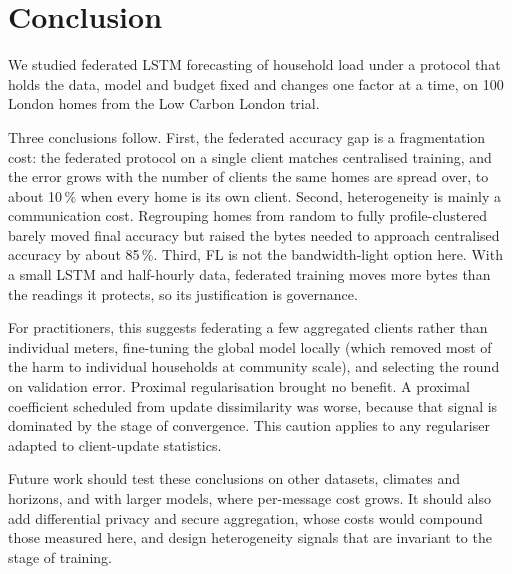 \section{Conclusion}\label{sec:conclusion}

We studied federated LSTM forecasting of household load under a protocol that holds the data, model and budget fixed
and changes one factor at a time, on 100 London homes from the Low Carbon London trial.

Three conclusions follow. First, the federated accuracy gap is a fragmentation cost: the federated protocol on a
single client matches centralised training, and the error grows with the number of clients the same homes are spread
over, to about 10\,\% when every home is its own client. Second, heterogeneity is mainly a communication cost.
Regrouping homes from random to fully profile-clustered barely moved final accuracy but raised the bytes needed to
approach centralised accuracy by about 85\,\%. Third, FL is not the bandwidth-light option here. With a small LSTM and
half-hourly data, federated training moves more bytes than the readings it protects, so its justification is
governance.

For practitioners, this suggests federating a few aggregated clients rather than individual meters, fine-tuning the
global model locally (which removed most of the harm to individual households at community scale), and selecting the
round on validation error. Proximal regularisation brought no benefit. A proximal coefficient scheduled from update
dissimilarity was worse, because that signal is dominated by the stage of convergence. This caution applies to any
regulariser adapted to client-update statistics.

Future work should test these conclusions on other datasets, climates and horizons, and with larger models, where
per-message cost grows. It should also add differential privacy and secure aggregation, whose costs would compound
those measured here, and design heterogeneity signals that are invariant to the stage of training.
